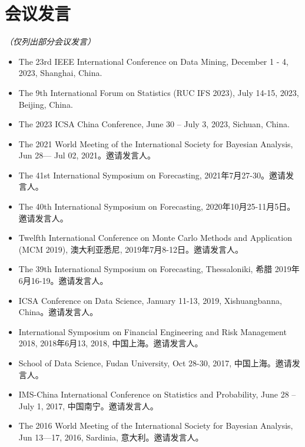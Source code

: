 \documentclass[twoside,a4paper,11pt]{article}
\begin{document}
\section{会议发言}

\emph{（仅列出部分会议发言）}

\begin{itemize}

\item The 23rd IEEE International Conference on Data Mining, December 1 - 4, 2023, Shanghai, China.

\item The 9th International Forum on Statistics (RUC IFS 2023), July 14-15, 2023, Beijing, China.

\item The 2023 ICSA China Conference, June 30 – July 3, 2023, Sichuan, China.

\item The 2021 World Meeting of the International Society for Bayesian Analysis, Jun
  28— Jul 02, 2021。邀请发言人。

\item The 41st International Symposium on Forecasting, 2021年7月27-30。邀请发言人。

\item The 40th International Symposium on Forecasting,  2020年10月25-11月5日。邀请发言人。

\item Twelfth International Conference on Monte Carlo Methods and Application (MCM 2019),
  澳大利亚悉尼, 2019年7月8-12日。邀请发言人。

\item The 39th International Symposium on Forecasting, Thessaloniki, 希腊 2019年6月16-19。邀请发言人。

\item ICSA Conference on Data Science, January 11-13, 2019, Xishuangbanna, China。邀请发言人。

\item International Symposium on Financial Engineering and Risk Management 2018, 2018年6月13,
  2018, 中国上海。邀请发言人。

\item School of Data Science, Fudan University, Oct 28-30, 2017, 中国上海。邀请发言人。

\item IMS-China International Conference on Statistics and Probability, June 28 – July 1,
  2017, 中国南宁。邀请发言人。


\item The 2016 World Meeting of the International Society for Bayesian Analysis, Jun
  13—17, 2016, Sardinia, 意大利。邀请发言人。


\end{itemize}
\end{document}
